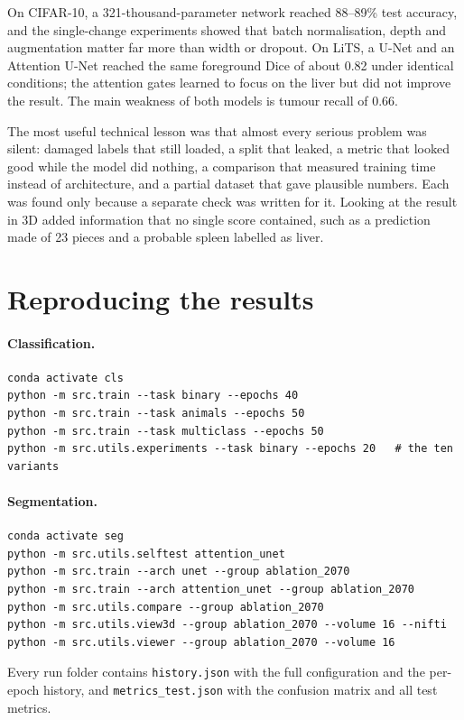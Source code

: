 \documentclass[11pt,a4paper]{article}
\newcommand{\code}[1]{\texttt{#1}}
\begin{document}
On CIFAR-10, a 321-thousand-parameter network reached 88--89\% test accuracy, and
the single-change experiments showed that batch normalisation, depth and
augmentation matter far more than width or dropout. On LiTS, a U-Net and an
Attention U-Net reached the same foreground Dice of about 0.82 under identical
conditions; the attention gates learned to focus on the liver but did not improve
the result. The main weakness of both models is tumour recall of 0.66.

The most useful technical lesson was that almost every serious problem was
silent: damaged labels that still loaded, a split that leaked, a metric that
looked good while the model did nothing, a comparison that measured training time
instead of architecture, and a partial dataset that gave plausible numbers. Each
was found only because a separate check was written for it. Looking at the result
in 3D added information that no single score contained, such as a prediction made
of 23 pieces and a probable spleen labelled as liver.

\appendix

\section{Reproducing the results}

\paragraph{Classification.}
\begin{verbatim}
conda activate cls
python -m src.train --task binary --epochs 40
python -m src.train --task animals --epochs 50
python -m src.train --task multiclass --epochs 50
python -m src.utils.experiments --task binary --epochs 20   # the ten variants
\end{verbatim}

\paragraph{Segmentation.}
\begin{verbatim}
conda activate seg
python -m src.utils.selftest attention_unet
python -m src.train --arch unet --group ablation_2070
python -m src.train --arch attention_unet --group ablation_2070
python -m src.utils.compare --group ablation_2070
python -m src.utils.view3d --group ablation_2070 --volume 16 --nifti
python -m src.utils.viewer --group ablation_2070 --volume 16
\end{verbatim}

Every run folder contains \code{history.json} with the full configuration and the
per-epoch history, and \code{metrics\_test.json} with the confusion matrix and all
test metrics.
\end{document}
